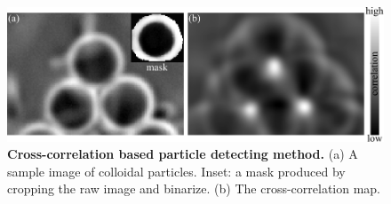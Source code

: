 \begin{figure}[h]
	\begin{center}
	\includegraphics[width=5.5in]{Figs/A-2/corrTrack.pdf}
	\end{center}
	\caption[Cross-correlation based particle detecting method]
	{
	\textbf{Cross-correlation based particle detecting method.}
  (a) A sample image of colloidal particles. Inset: a mask produced by cropping the raw image and binarize.
  (b) The cross-correlation map.
	}
	\label{fig:corr-track}
\end{figure}


